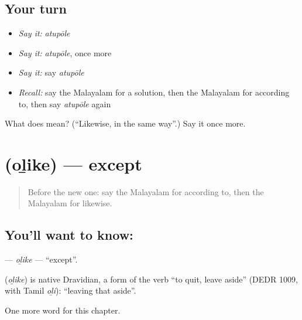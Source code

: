 \subsection*{Your turn}
\begin{itemize}
\raggedright
  \item \emph{Say it:} \emph{atupōle}
  \item \emph{Say it:} \emph{atupōle}, once more
  \item \emph{Say it:} say \emph{atupōle}
  \item \emph{Recall:} say the Malayalam for a solution, then the Malayalam for according to, then say \emph{atupōle} again
\end{itemize}

\begin{tcolorbox}[breakable,colback=teal!4,colframe=teal!35!black,title={Before you move on}]
What does  mean? (\textquotedblleft{}Likewise, in the same way\textquotedblright{}.) Say it once more.
\end{tcolorbox}
\section[\texorpdfstring{\ml{ഒഴികെ} (oḻike)}{ഒഴികെ (oḻike)}]{ (oḻike) — except}

\label{lesson:ML-C201-olike}



\begin{quote}
Before the new one: say the Malayalam for according to, then the Malayalam for likewise.
\end{quote}

\subsection*{You'll want to know: }
\textbf{} — \emph{oḻike} — \textquotedblleft{}except\textquotedblright{}.

\begin{cousinweb}
\textbf{} (\emph{oḻike}) is native Dravidian, a form of the verb \textquotedblleft{}to quit, leave aside\textquotedblright{} (DEDR 1009, with Tamil \emph{oḻi}): \textquotedblleft{}leaving that aside\textquotedblright{}.
\end{cousinweb}

\begin{grammarlens}[title={What you've built}]
One more word for this chapter.
\end{grammarlens}

